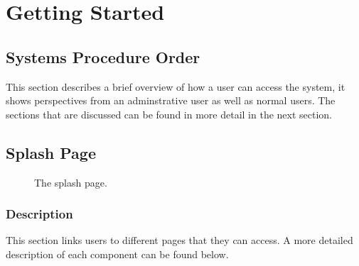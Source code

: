 \documentclass[14pt, a4paper]{article}
\begin{document}
\section{Getting Started}
\subsection{Systems Procedure Order}
This section describes a brief overview of how a user can access the system, it shows perspectives from an adminstrative user as well as normal users. The sections that are discussed can be found in more detail in the next section.
\subsection{Splash Page}
	\begin{figure}[H]
		\caption{The splash page.}
  		\label{fig:splash1}
	\end{figure}
	\subsubsection{Description}
		This section links users to different pages that they can access. A more detailed description of each component can be found below.
\end{document}
